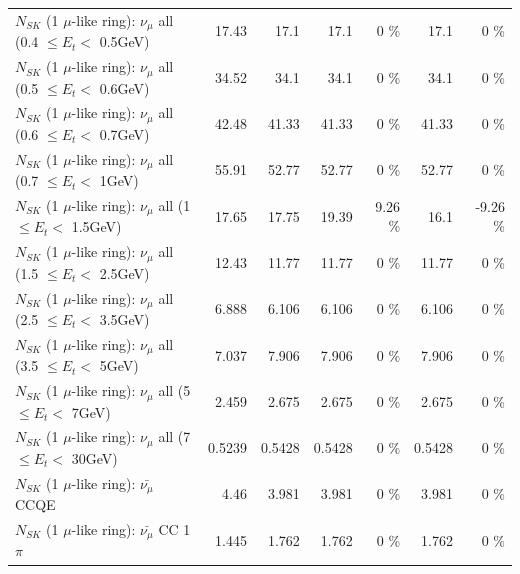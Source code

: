 \begin{table}
\begin{tabular}{| l | r | r | r  r | r  r |}
       $N_{SK}$ (1 $\mu$-like ring): $\nu_{\mu}$ all (0.4 $\leq E_{t} <$ 0.5GeV) &           17.43 &            17.1 &            17.1 &        0 \%  &            17.1 &        0 \%  \\ 
       $N_{SK}$ (1 $\mu$-like ring): $\nu_{\mu}$ all (0.5 $\leq E_{t} <$ 0.6GeV) &           34.52 &            34.1 &            34.1 &        0 \%  &            34.1 &        0 \%  \\ 
       $N_{SK}$ (1 $\mu$-like ring): $\nu_{\mu}$ all (0.6 $\leq E_{t} <$ 0.7GeV) &           42.48 &           41.33 &           41.33 &        0 \%  &           41.33 &        0 \%  \\ 
         $N_{SK}$ (1 $\mu$-like ring): $\nu_{\mu}$ all (0.7 $\leq E_{t} <$ 1GeV) &           55.91 &           52.77 &           52.77 &        0 \%  &           52.77 &        0 \%  \\ 
         $N_{SK}$ (1 $\mu$-like ring): $\nu_{\mu}$ all (1 $\leq E_{t} <$ 1.5GeV) &           17.65 &           17.75 &           19.39 &     9.26 \%  &            16.1 &    -9.26 \%  \\ 
       $N_{SK}$ (1 $\mu$-like ring): $\nu_{\mu}$ all (1.5 $\leq E_{t} <$ 2.5GeV) &           12.43 &           11.77 &           11.77 &        0 \%  &           11.77 &        0 \%  \\ 
       $N_{SK}$ (1 $\mu$-like ring): $\nu_{\mu}$ all (2.5 $\leq E_{t} <$ 3.5GeV) &           6.888 &           6.106 &           6.106 &        0 \%  &           6.106 &        0 \%  \\ 
         $N_{SK}$ (1 $\mu$-like ring): $\nu_{\mu}$ all (3.5 $\leq E_{t} <$ 5GeV) &           7.037 &           7.906 &           7.906 &        0 \%  &           7.906 &        0 \%  \\ 
           $N_{SK}$ (1 $\mu$-like ring): $\nu_{\mu}$ all (5 $\leq E_{t} <$ 7GeV) &           2.459 &           2.675 &           2.675 &        0 \%  &           2.675 &        0 \%  \\ 
          $N_{SK}$ (1 $\mu$-like ring): $\nu_{\mu}$ all (7 $\leq E_{t} <$ 30GeV) &          0.5239 &          0.5428 &          0.5428 &        0 \%  &          0.5428 &        0 \%  \\ 
\hline
\hline
\hline
                              $N_{SK}$ (1 $\mu$-like ring): $\bar{\nu_\mu}$ CCQE &            4.46 &           3.981 &           3.981 &        0 \%  &           3.981 &        0 \%  \\ 
                         $N_{SK}$ (1 $\mu$-like ring): $\bar{\nu_\mu}$ CC 1$\pi$ &           1.445 &           1.762 &           1.762 &        0 \%  &           1.762 &        0 \%  \\ 

\end{tabular}
\end{table}
